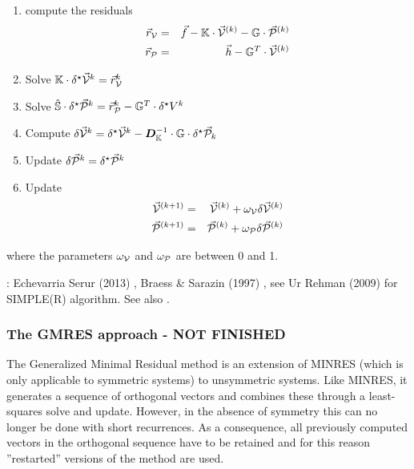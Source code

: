 \begin{mdframed}[backgroundcolor=blue!5]
\begin{enumerate}
\item compute the residuals 
\begin{eqnarray}
\vec{r}_{\cal V} &=& \vec{f} - {\mathbb{K}} \cdot \vec{\cal V}^{(k)} - {\mathbb{G}} \cdot \vec{\cal P}^{(k)} \nonumber\\
\vec{r}_{\cal P} &=& \vec{h} - {\mathbb{G}}^T \cdot \vec{\cal V}^{(k)}
\end{eqnarray}
\item Solve ${\mathbb{K}}  \cdot \delta^\star \vec{\cal V}^k =  \vec{r}_{\cal V}^k  $
\item Solve $\hat{{\mathbb{S}}} \cdot \delta^\star \vec{\cal P}^k =  \vec{r}_{\cal P}^k - {\mathbb{G}}^T \cdot  \delta^\star V^k $
\item Compute $\delta \vec{\cal V}^k = \delta^\star \vec{\cal V}^k -{\bm D}_{\mathbb{K}}^{-1} \cdot {\mathbb{G}} \cdot \delta^\star \vec{\cal P}_k $
\item Update $\delta \vec{\cal P}^k = \delta^\star \vec{\cal P}^k$
\item Update 
\begin{eqnarray}
\vec{\cal V}^{(k+1)} &=& \vec{\cal V}^{(k)} + \omega_{\cal V} \delta \vec{\cal V}^{(k)} \nonumber\\
\vec{\cal P}^{(k+1)} &=& \vec{\cal P}^{(k)} + \omega_{\cal P} \delta \vec{\cal P}^{(k)} 
\end{eqnarray}
\end{enumerate}
\end{mdframed}
where the parameters $\omega_{\cal V}$ and $\omega_{\cal P}$ are between 0 and 1. 

\Literature: Echevarria Serur (2013) \cite{eche13}, Braess \& Sarazin (1997) \cite{brsa97b}, 
see Ur Rehman \etal (2009) \cite{urvs09} for SIMPLE(R) algorithm. See also \cite{tack10}.
















\subsubsection{The GMRES approach - NOT FINISHED}

The Generalized Minimal Residual method \cite{sasc86} 
is an extension of MINRES (which is only applicable to symmetric systems) to unsymmetric systems. 
Like MINRES, it generates a sequence of orthogonal vectors and 
combines these through a least-squares solve and update. However, 
in the absence of symmetry this can no longer be done with short recurrences. As a consequence, 
all previously computed vectors in the orthogonal sequence have to be retained and 
for this reason ''restarted'' versions of the method are used.

